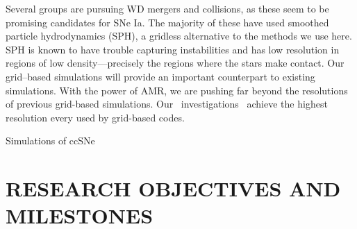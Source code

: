 \documentclass[11pt,letterpaper,english]{article}
\begin{document}
Several groups are pursuing WD mergers and collisions, as these seem  
to be promising candidates for SNe Ia.  The majority of these have
used smoothed particle hydrodynamics (SPH), a gridless alternative to
the methods we use here.  SPH is known to have trouble capturing
instabilities and has low resolution in regions of low
density---precisely the regions where the stars make contact.  Our
grid--based simulations will provide an important counterpart to
existing simulations.  With the power of AMR, we are pushing far
beyond the resolutions of previous grid-based simulations.  Our
\castro\ investigations~\cite{katz:2016}  achieve the highest
resolution every used by grid-based codes.  

Simulations of ccSNe 


\section{RESEARCH OBJECTIVES AND MILESTONES }  








\end{document}

